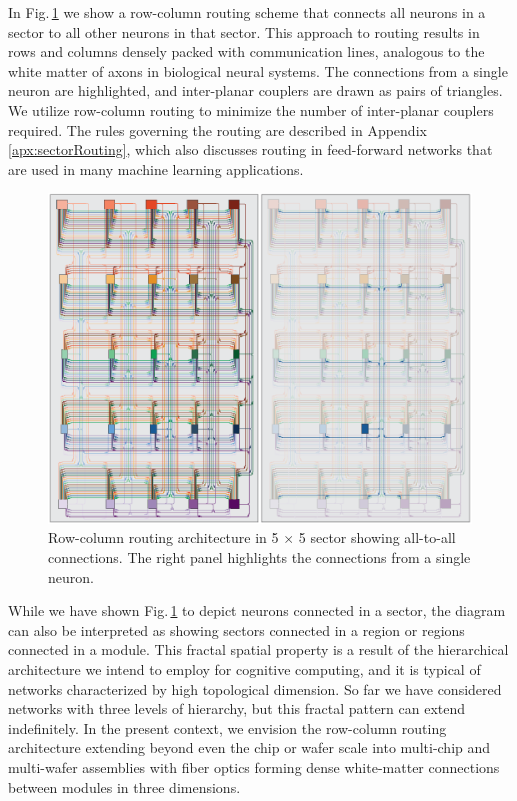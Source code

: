 \documentclass[twocolumn]{article}
\begin{document}
In Fig.\,\ref{fig:networks_routingDiagram} we show a row-column routing scheme that connects all neurons in a sector to all other neurons in that sector. This approach to routing results in rows and columns densely packed with communication lines, analogous to the white matter of axons in biological neural systems. The connections from a single neuron are highlighted, and inter-planar couplers are drawn as pairs of triangles. We utilize row-column routing to minimize the number of inter-planar couplers required. The rules governing the routing are described in Appendix \ref{apx:sectorRouting}, which also discusses routing in feed-forward networks that are used in many machine learning applications.
\begin{figure}[t!]
	\centerline{\includegraphics[width=17.2cm]{_networks_routingDiagram_small.pdf}}
	\caption{\label{fig:networks_routingDiagram}Row-column routing architecture in 5 $\times$ 5 sector showing all-to-all connections. The right panel highlights the connections from a single neuron.}
\end{figure}

While we have shown Fig.\,\ref{fig:networks_routingDiagram} to depict neurons connected in a sector, the diagram can also be interpreted as showing sectors connected in a region or regions connected in a module. This fractal spatial property is a result of the hierarchical architecture we intend to employ for cognitive computing, and it is typical of networks characterized by high topological dimension. So far we have considered networks with three levels of hierarchy, but this fractal pattern can extend indefinitely. In the present context, we envision the row-column routing architecture extending beyond even the chip or wafer scale into multi-chip and multi-wafer assemblies with fiber optics forming dense white-matter connections between modules in three dimensions. 
\end{document}
